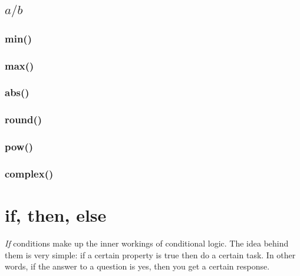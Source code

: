 \documentclass[12pt,a4paper]{book}
\begin{document}
				\subsection{$a/b$}
					\vspace{3cm}

				\subsubsection{min()}
					\vspace{7cm}

				\subsubsection{max()}
					\vspace{7cm}

				\subsubsection{abs()}
					\vspace{7cm}

				\subsubsection{round()}
					\vspace{7cm}

				\subsubsection{pow()}
					\vspace{7cm}

				\subsubsection{complex()}
					\vspace{7cm}

		\section{if, then, else}
			\textit{If} conditions make up the inner workings of conditional logic. The idea behind them is very simple: if a certain property is true then do a certain task. In other words, if the answer to a question is yes, then you get a certain response.
			\vspace{10cm}
\end{document}
